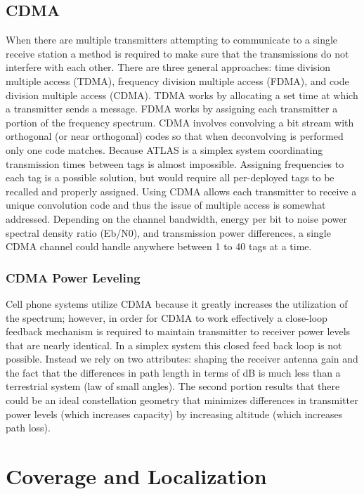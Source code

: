 \documentclass{article}
\begin{document}
\subsection{CDMA}
When there are multiple transmitters attempting to communicate to a single receive station a method is required to make sure that the transmissions do not interfere with each other. There are three general approaches: time division multiple access (TDMA), frequency division multiple access (FDMA), and code division multiple access (CDMA). TDMA works by allocating a set time at which a transmitter sends a message. FDMA works by assigning each transmitter a portion of the frequency spectrum. CDMA involves convolving a bit stream with orthogonal  (or near orthogonal) codes so that when deconvolving is performed only one code matches. Because ATLAS is a simplex system coordinating transmission times between tags is almost impossible. Assigning frequencies to each tag is a possible solution, but would require all per-deployed tags to be recalled and properly assigned. Using CDMA allows each transmitter to receive a unique convolution code and thus the issue of multiple access is somewhat addressed. Depending on the channel bandwidth, energy per bit to noise power spectral density ratio (Eb/N0), and transmission power differences, a single CDMA channel could handle anywhere between 1 to 40 tags at a time.

\subsubsection{CDMA Power Leveling}
Cell phone systems utilize CDMA because it greatly increases the utilization of the spectrum; however, in order for CDMA to work effectively a close-loop feedback mechanism is required to maintain transmitter to receiver power levels that are nearly identical. In a simplex system this closed feed back loop is not possible. Instead we rely on two attributes: shaping the receiver antenna gain and the fact that the differences in path length in terms of dB is much less than a terrestrial system (law of small angles). The second portion results that there could be an ideal constellation geometry that minimizes differences in transmitter power levels (which increases capacity) by increasing altitude (which increases path loss).

\section{Coverage and Localization}
\end{document}
